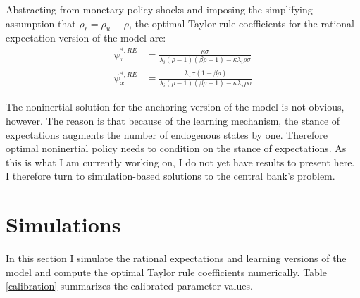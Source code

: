 \documentclass[11pt]{article}
\renewcommand{\[}{\begin{equation}}
\renewcommand{\]}{\end{equation}}
\begin{document}
Abstracting from monetary policy shocks and imposing the simplifying assumption that $\rho_r = \rho_u \equiv \rho$, the optimal Taylor rule coefficients for the rational expectation version of the model are:
\begin{align}
\psi_{\pi}^{*,RE} & = \frac{\kappa  \sigma }{\lambda_i(\rho -1) (\beta  \rho -1)-\kappa  \lambda_i \rho  \sigma } \label{opt_phipi_RE}
\\
\psi_{x}^{*,RE} & =  \frac{\lambda_x\sigma  (1-\beta  \rho )}{\lambda_i (\rho -1) (\beta  \rho -1)-\kappa  \lambda_x \rho  \sigma } \label{opt_phix_RE}
\end{align}

The noninertial solution for the anchoring version of the model is not obvious, however. The reason is that because of the learning mechanism, the stance of expectations augments the number of endogenous states by one. Therefore optimal noninertial policy needs to condition on the stance of expectations. As this is what I am currently working on, I do not yet have results to present here. I therefore turn to simulation-based solutions to the central bank's problem.


\section{Simulations}\label{results_sim}
In this section I simulate the rational expectations and learning versions of the model and compute the optimal Taylor rule coefficients numerically. Table \ref{calibration} summarizes the calibrated parameter values.
\end{document}

